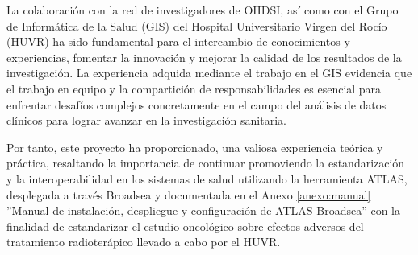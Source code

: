 
La colaboración con la red de investigadores de OHDSI, así como con el Grupo de Informática de la Salud (GIS) del Hospital Universitario Virgen del Rocío (HUVR) ha sido fundamental para el intercambio de conocimientos y experiencias, fomentar la innovación y mejorar la calidad de los resultados de la investigación. La experiencia adquida mediante el trabajo en el GIS evidencia que el trabajo  en equipo y la compartición de responsabilidades es esencial para enfrentar desafíos complejos concretamente en el campo del análisis de datos clínicos para lograr avanzar en la investigación sanitaria.


Por tanto, este proyecto ha proporcionado,  una valiosa experiencia teórica y práctica, resaltando la importancia de continuar promoviendo la estandarización y la interoperabilidad en los sistemas de salud utilizando la herramienta ATLAS, desplegada a través Broadsea y documentada en el Anexo \ref{anexo:manual} ''Manual de instalación, despliegue y configuración de ATLAS Broadsea'' con la finalidad de estandarizar el estudio oncológico sobre efectos adversos del tratamiento radioterápico llevado a cabo por el HUVR.

